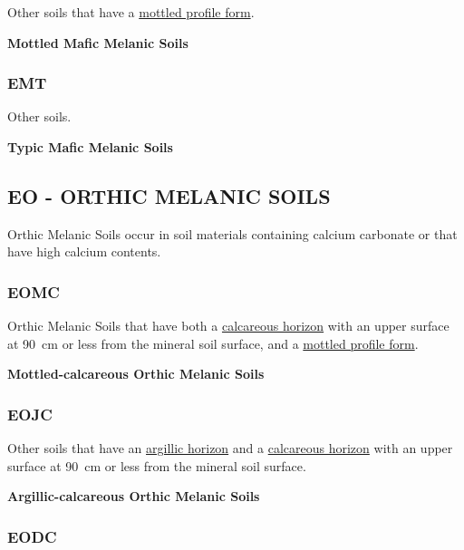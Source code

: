 \documentclass[
  letterpaper,
  DIV=11,
  numbers=noendperiod]{scrreprt}
\begin{document}
Other soils that have a \protect\hyperlink{sec-diag-mottpf}{mottled
profile form}.

\textbf{Mottled Mafic Melanic Soils}

\hypertarget{sec-key-EMT}{%
\subsubsection{\texorpdfstring{\textbf{EMT}}{EMT}}\label{sec-key-EMT}}

Other soils.

\textbf{Typic Mafic Melanic Soils}

\hypertarget{sec-EO}{%
\subsection{\texorpdfstring{\textbf{EO} - ORTHIC MELANIC
SOILS}{EO - ORTHIC MELANIC SOILS}}\label{sec-EO}}

Orthic Melanic Soils occur in soil materials containing calcium
carbonate or that have high calcium contents.

\hypertarget{sec-key-EOMC}{%
\subsubsection{\texorpdfstring{\textbf{EOMC}}{EOMC}}\label{sec-key-EOMC}}

Orthic Melanic Soils that have both a
\protect\hyperlink{sec-diag-calch}{calcareous horizon} with an upper
surface at 90~cm or less from the mineral soil surface, and a
\protect\hyperlink{sec-diag-mottpf}{mottled profile form}.

\textbf{Mottled-calcareous Orthic Melanic Soils}

\hypertarget{sec-key-EOJC}{%
\subsubsection{\texorpdfstring{\textbf{EOJC}}{EOJC}}\label{sec-key-EOJC}}

Other soils that have an \protect\hyperlink{sec-diag-argh}{argillic
horizon} and a \protect\hyperlink{sec-diag-calch}{calcareous horizon}
with an upper surface at 90~cm or less from the mineral soil surface.

\textbf{Argillic-calcareous Orthic Melanic Soils}

\hypertarget{sec-key-EODC}{%
\subsubsection{\texorpdfstring{\textbf{EODC}}{EODC}}\label{sec-key-EODC}}
\end{document}
